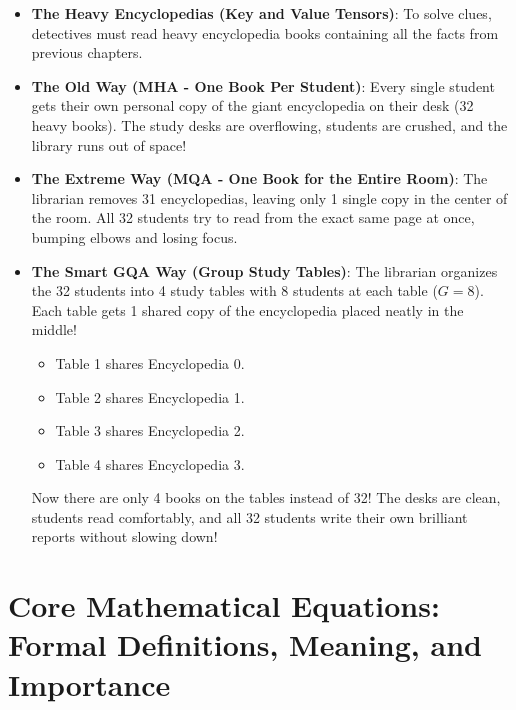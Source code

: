 \documentclass[11pt,a4paper]{article}
\theoremstyle{definition}
\begin{document}
\begin{itemize}
    \item \textbf{The Heavy Encyclopedias (Key and Value Tensors)}:
    To solve clues, detectives must read heavy encyclopedia books containing all the facts from previous chapters.
    
    \item \textbf{The Old Way (MHA - One Book Per Student)}:
    Every single student gets their own personal copy of the giant encyclopedia on their desk (32 heavy books). The study desks are overflowing, students are crushed, and the library runs out of space!
    
    \item \textbf{The Extreme Way (MQA - One Book for the Entire Room)}:
    The librarian removes 31 encyclopedias, leaving only 1 single copy in the center of the room. All 32 students try to read from the exact same page at once, bumping elbows and losing focus.
    
    \item \textbf{The Smart GQA Way (Group Study Tables)}:
    The librarian organizes the 32 students into 4 study tables with 8 students at each table ($G = 8$).
    Each table gets 1 shared copy of the encyclopedia placed neatly in the middle!
    \begin{itemize}
        \item Table 1 shares Encyclopedia 0.
        \item Table 2 shares Encyclopedia 1.
        \item Table 3 shares Encyclopedia 2.
        \item Table 4 shares Encyclopedia 3.
    \end{itemize}
    Now there are only 4 books on the tables instead of 32! The desks are clean, students read comfortably, and all 32 students write their own brilliant reports without slowing down!
\end{itemize}

\section{Core Mathematical Equations: Formal Definitions, Meaning, and Importance}
\end{document}
